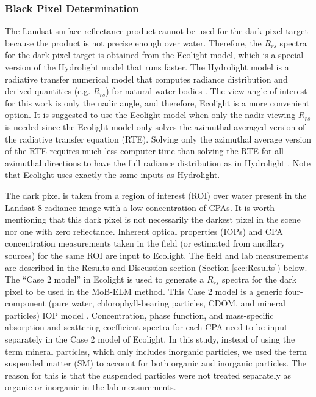 \documentclass[onecolumn,3p,letterpaper]{elsarticle}
\begin{document}
\subsubsection{Black Pixel Determination}
\label{subsubsec:blackpixel}

The Landsat surface reflectance product cannot be used for the dark pixel target because the product is not precise enough over water. Therefore, the $R_{rs}$ spectra for the dark pixel target is obtained from the Ecolight model, which is a special version of the Hydrolight model that runs faster. The Hydrolight model is a radiative transfer numerical model that computes radiance distribution and derived quantities (e.g. $R_{rs}$) for natural water bodies \citep{MobleyHE}. The view angle of interest for this work is only the nadir angle, and therefore, Ecolight is a more convenient option. It is suggested to use the Ecolight model when only the nadir-viewing $R_{rs}$ is needed since the Ecolight model only solves the azimuthal averaged version of the radiative transfer equation (RTE). Solving only the azimuthal average version of the RTE requires much less computer time than solving the RTE for all azimuthal directions to have the full radiance distribution as in Hydrolight \citep{MobleyHE}. Note that Ecolight uses exactly the same inputs as Hydrolight.

The dark pixel is taken from a region of interest (ROI) over water present in the Landsat 8 radiance image with a low concentration of CPAs. It is worth mentioning that this dark pixel is not necessarily the darkest pixel in the scene nor one with zero reflectance. Inherent optical properties (IOPs) and CPA concentration measurements taken in the field (or estimated from ancillary sources) for the same ROI are input to Ecolight. The field and lab measurements are described in the Results and Discussion section (Section \ref{sec:Results}) below. The ``Case 2 model'' in Ecolight is used to generate a $R_{rs}$ spectra for the dark pixel to be used in the MoB-ELM method. This Case 2 model is a generic four-component (pure water, chlorophyll-bearing particles, CDOM, and mineral particles) IOP model \citep{MobleyHEtech}. Concentration, phase function, and mass-specific absorption and scattering coefficient spectra for each CPA need to be input separately in the Case 2 model of Ecolight. In this study, instead of using the term mineral particles, which only includes inorganic particles, we used the term suspended matter (SM) to account for both organic and inorganic particles. The reason for this is that the suspended particles were not treated separately as organic or inorganic in the lab measurements.
\end{document}
